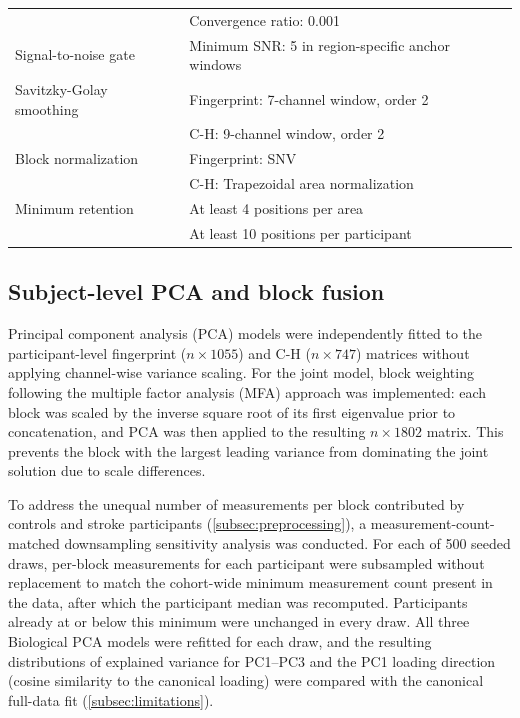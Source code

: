 \documentclass[preprint,12pt]{elsarticle}
\begin{document}
\begin{table}[ht]
\begin{tabularx}{\textwidth}{@{}>{\raggedright\arraybackslash}p{} >{\raggedright\arraybackslash}X@{}}
                          & Convergence ratio: 0.001 \\
\addlinespace
Signal-to-noise gate & Minimum SNR: 5 in region-specific anchor windows \\
\addlinespace
Savitzky-Golay smoothing & Fingerprint: 7-channel window, order 2 \\
                         & C-H: 9-channel window, order 2 \\
\addlinespace
Block normalization & Fingerprint: SNV \\
                    & C-H: Trapezoidal area normalization \\
\addlinespace
Minimum retention & At least 4 positions per area \\
                  & At least 10 positions per participant \\
\bottomrule
\end{tabularx}
\end{table}

\subsection{Subject-level PCA and block fusion} 
\label{subsec:biopca}

Principal component analysis (PCA) models were independently fitted to the participant-level fingerprint ($n\times1055$) and C-H ($n\times747$) matrices without applying channel-wise variance scaling. For the joint model, block weighting following the multiple factor analysis (MFA) approach was implemented: each block was scaled by the inverse square root of its first eigenvalue prior to concatenation, and PCA was then applied to the resulting $n\times1802$ matrix. This prevents the block with the largest leading variance from dominating the joint solution due to scale differences.

To address the unequal number of measurements per block contributed by controls and stroke participants (\cref{subsec:preprocessing}), a measurement-count-matched downsampling sensitivity analysis was conducted. For each of 500 seeded draws, per-block measurements for each participant were subsampled without replacement to match the cohort-wide minimum measurement count present in the data, after which the participant median was recomputed. Participants already at or below this minimum were unchanged in every draw. All three Biological PCA models were refitted for each draw, and the resulting distributions of explained variance for PC1–PC3 and the PC1 loading direction (cosine similarity to the canonical loading) were compared with the canonical full-data fit (\cref{subsec:limitations}).
\end{document}

